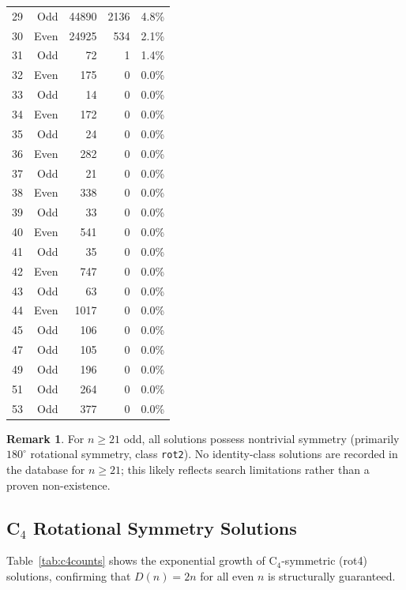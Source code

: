 \documentclass[11pt,a4paper]{article}
\theoremstyle{plain}
\theoremstyle{definition}
\newtheorem{remark}[theorem]{Remark}
\begin{document}
\begin{table}[H]
\begin{tabular}{crrrc}
29 & Odd & 44890 & 2136 & 4.8\%\\
30 & Even & 24925 & 534 & 2.1\%\\
31 & Odd & 72 & 1 & 1.4\%\\
32 & Even & 175 & 0 & 0.0\%\\
33 & Odd & 14 & 0 & 0.0\%\\
34 & Even & 172 & 0 & 0.0\%\\
35 & Odd & 24 & 0 & 0.0\%\\
36 & Even & 282 & 0 & 0.0\%\\
37 & Odd & 21 & 0 & 0.0\%\\
38 & Even & 338 & 0 & 0.0\%\\
39 & Odd & 33 & 0 & 0.0\%\\
40 & Even & 541 & 0 & 0.0\%\\
41 & Odd & 35 & 0 & 0.0\%\\
42 & Even & 747 & 0 & 0.0\%\\
43 & Odd & 63 & 0 & 0.0\%\\
44 & Even & 1017 & 0 & 0.0\%\\
45 & Odd & 106 & 0 & 0.0\%\\
47 & Odd & 105 & 0 & 0.0\%\\
49 & Odd & 196 & 0 & 0.0\%\\
51 & Odd & 264 & 0 & 0.0\%\\
53 & Odd & 377 & 0 & 0.0\%\\
\bottomrule
\end{tabular}
\end{table}

\begin{remark}
For $n\ge 21$ odd, all solutions possess nontrivial symmetry (primarily $180^\circ$ rotational symmetry, class \texttt{rot2}). No identity-class solutions are recorded in the database for $n\ge 21$; this likely reflects search limitations rather than a proven non-existence.
\end{remark}

\subsection{C$_4$ Rotational Symmetry Solutions}

Table~\ref{tab:c4counts} shows the exponential growth of C$_4$-symmetric (rot4) solutions, confirming that $D(n)=2n$ for all even $n$ is structurally guaranteed.
\end{document}
